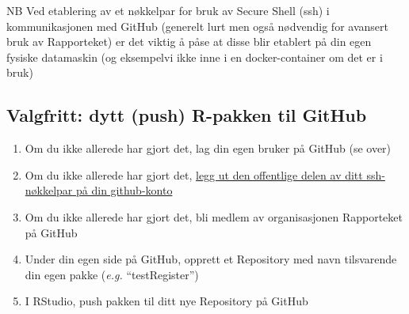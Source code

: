 \documentclass[]{article}
\providecommand{\tightlist}{%
  \setlength{\itemsep}{0pt}\setlength{\parskip}{0pt}}
\def\labelenumi{\arabic{enumi}.}
\begin{document}
NB Ved etablering av et nøkkelpar for bruk av Secure Shell (ssh) i
kommunikasjonen med GitHub (generelt lurt men også nødvendig for
avansert bruk av Rapporteket) er det viktig å påse at disse blir
etablert på din egen fysiske datamaskin (og eksempelvi ikke inne i en
docker-container om det er i bruk)

\subsection{Valgfritt: dytt (push) R-pakken til
GitHub}\label{valgfritt-dytt-push-r-pakken-til-github}

\begin{enumerate}
\def\labelenumi{\arabic{enumi}.}
\tightlist
\item
  Om du ikke allerede har gjort det, lag din egen bruker på GitHub (se
  over)
\item
  Om du ikke allerede har gjort det,
  \href{https://help.github.com/en/articles/adding-a-new-ssh-key-to-your-github-account}{legg
  ut den offentlige delen av ditt ssh-nøkkelpar på din github-konto}
\item
  Om du ikke allerede har gjort det, bli medlem av organisasjonen
  Rapporteket på GitHub
\item
  Under din egen side på GitHub, opprett et Repository med navn
  tilsvarende din egen pakke (\emph{e.g.} ``testRegister'')
\item
  I RStudio, push pakken til ditt nye Repository på GitHub
\end{enumerate}
\end{document}
